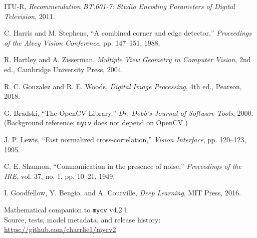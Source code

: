 \documentclass[11pt,a4paper]{article}
\newcommand{\1}{\mathbf{1}}
\newcommand{\mycv}{\texttt{mycv}}
\begin{document}
\begin{enumerate}[label={[\arabic*]}]
\item ITU-R, \emph{Recommendation BT.601-7: Studio Encoding Parameters of
Digital Television}, 2011.
\item C. Harris and M. Stephens, ``A combined corner and edge detector,''
\emph{Proceedings of the Alvey Vision Conference}, pp. 147--151, 1988.
\item R. Hartley and A. Zisserman, \emph{Multiple View Geometry in Computer
Vision}, 2nd ed., Cambridge University Press, 2004.
\item R. C. Gonzalez and R. E. Woods, \emph{Digital Image Processing}, 4th ed.,
Pearson, 2018.
\item G. Bradski, ``The OpenCV Library,'' \emph{Dr. Dobb's Journal of Software
Tools}, 2000. (Background reference; \mycv{} does not depend on OpenCV.)
\item J. P. Lewis, ``Fast normalized cross-correlation,'' \emph{Vision
Interface}, pp. 120--123, 1995.
\item C. E. Shannon, ``Communication in the presence of noise,''
\emph{Proceedings of the IRE}, vol. 37, no. 1, pp. 10--21, 1949.
\item I. Goodfellow, Y. Bengio, and A. Courville, \emph{Deep Learning}, MIT
Press, 2016.
\end{enumerate}

\vfill
\begin{center}\small\color{muted}
Mathematical companion to \mycv{} v4.2.1 \\
Source, tests, model metadata, and release history: \\
\url{https://github.com/charrlie1/mycv2}
\end{center}
\end{document}
